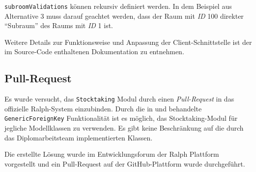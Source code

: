 \begin{Shaded}
\begin{Highlighting}[]
\FunctionTok{\{}
    \FunctionTok{:} \FunctionTok{,}
    \FunctionTok{:} \OtherTok{[}
    \OtherTok{]}\FunctionTok{,}
    \FunctionTok{:} \OtherTok{[}\FunctionTok{\{}
            \FunctionTok{:} \FunctionTok{,}
            \FunctionTok{:} \OtherTok{[}\FunctionTok{\{}
                    \FunctionTok{:} 
                \FunctionTok{\}}
            \OtherTok{]}\FunctionTok{,}
            \FunctionTok{:} \OtherTok{[}
            \OtherTok{]}
        \FunctionTok{\}}
    \OtherTok{]}
\FunctionTok{\}}
\end{Highlighting}
\end{Shaded}

\texttt{subroomValidations} können rekursiv definiert werden. In dem
Beispiel aus Alternative 3 muss darauf geachtet werden, dass der Raum
mit \emph{ID}
100 direkter ``Subraum'' des Raums mit \emph{ID}
1 ist.

Weitere Details zur Funktionsweise und Anpassung der
Client-Schnittstelle ist der im Source-Code enthaltenen Dokumentation zu
entnehmen.

\hypertarget{pull-request}{%
\subsection{Pull-Request}\label{pull-request}}

Es wurde versucht, das \texttt{Stocktaking} Modul durch einen
\emph{Pull-Request}
in das offizielle Ralph-System einzubinden. Durch die in
 und
 behandelte \texttt{GenericForeignKey}
Funktionalität \cite{django-doku-contenttypes} ist es möglich, das
Stocktaking-Modul für jegliche Modellklassen zu verwenden. Es gibt keine
Beschränkung auf die durch das Diplomarbeitsteam implementierten
Klassen.

Die erstellte Lösung wurde im Entwicklungsforum der Ralph Plattform
vorgestellt \cite{ralph-forum-1} \cite{ralph-forum-2} und ein
Pull-Request auf der GitHub-Plattform wurde durchgeführt.
